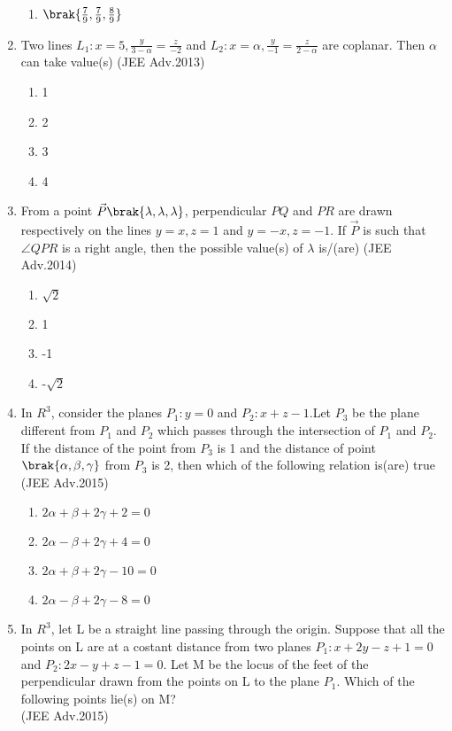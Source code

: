 \begin{enumerate}
\begin{multicols}{4}
\begin{enumerate}
			\item $\brak{\frac{7}{9},\frac{7}{9},\frac{8}{9}}$
		\end{enumerate}
\end{multicols}
	\item Two lines $L_1: x=5,\frac{y}{3-\alpha}=\frac{z}{-2}$ and $L_2: x=\alpha,\frac{y}{-1}=\frac{z}{2-\alpha}$ are coplanar. Then $\alpha$ can take value(s) \hfill{(JEE Adv.2013)}
		\begin{enumerate}
			\item 1
			\item 2 
			\item 3
			\item 4
		\end{enumerate}
	\item From a point $\vec{P}\brak{\lambda,\lambda,\lambda}$, perpendicular $PQ$ and $PR$ are drawn respectively on the lines $y=x,z=1$ and $y=-x,z=-1$. If $\vec{P}$ is such that $\angle QPR$ is a right angle, then
		the possible value(s) of $\lambda$ is/(are) \hfill{(JEE Adv.2014)}
		\begin{enumerate}
			\item $\sqrt{2}$
			\item 1 
			\item -1 
			\item -$\sqrt{2}$
		\end{enumerate}
	\item In $R^3$, consider the planes $P_1:y=0$ and $P_2:x+z-1$.Let $P_3$ be the plane different from $P_1$ and $P_2$ which passes through the intersection of $P_1$ and $P_2$. If the distance of the
		point from $P_3$ is 1 and the distance of point $\brak{\alpha,\beta,\gamma}$ from $P_3$ is 2,  then which of the following relation is(are) true \hfill{(JEE Adv.2015)}
		\begin{enumerate}
			\item $2\alpha+\beta+2\gamma+2=0$
			\item $2\alpha-\beta+2\gamma+4=0$
			\item $2\alpha+\beta+2\gamma-10=0$
			\item $2\alpha-\beta+2\gamma-8=0$
		\end{enumerate}
	\item In $R^3$, let L be a straight line passing through the origin. Suppose that all the points on L are at a costant distance from two planes $P_1:x+2y-z+1=0$ and $P_2:2x-y+z-1=0$. Let M be the
		locus of the feet of the perpendicular drawn from the points on L to the plane $P_1$. Which of the following points lie(s) on M? \\ \hfill{(JEE Adv.2015)}

\end{enumerate}
